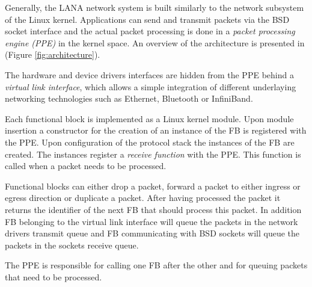 \documentclass{sig-alternate}
\newcommand{\daniel}[1]{\textcolor{red}{\emph{DB: #1}}}
\begin{document}
Generally, the LANA network system is built similarly to the network subsystem of the Linux kernel.
Applications can send and transmit packets via the BSD socket interface and the actual packet processing is done in a \textit{packet processing engine (PPE)} in the kernel space. An overview of the architecture is presented in (Figure \ref{fig:architecture}).


The hardware and device drivers interfaces are hidden from the PPE behind a \textit{virtual link interface}, which allows a simple integration of different underlaying networking technologies such as Ethernet, Bluetooth or InfiniBand.

Each functional block is implemented as a Linux kernel module. 
Upon module insertion a constructor for the creation of an instance of the FB is registered with the PPE. Upon configuration of the protocol stack the instances of the FB are created. The instances register a \textit{receive function} with the PPE. This function is called when a packet needs to be processed.

Functional blocks can either drop a packet, forward a packet to either ingress or egress direction or duplicate a packet. After having processed the packet it returns the identifier of the next FB that should process this packet. In addition FB belonging to the virtual link interface will queue the packets in the network drivers transmit queue and FB communicating with BSD sockets will queue the packets in the sockets receive queue.

The PPE is responsible for calling one FB after the other and for queuing packets that need to be processed.

\end{document}
